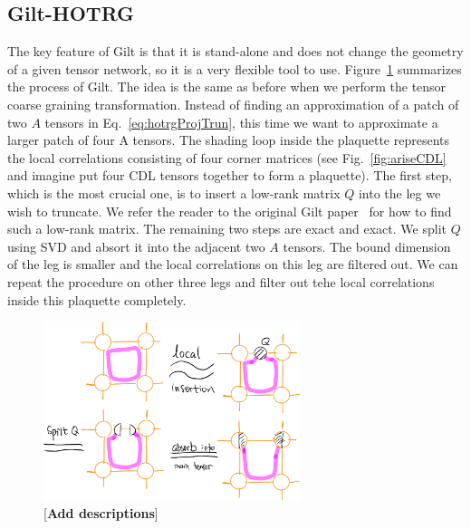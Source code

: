 \documentclass[aps,prb,reprint,superscriptaddress]{revtex4-2}
\begin{document}
\subsection{Gilt-HOTRG\label{gilt-hotrg}}
The key feature of Gilt is that it is stand-alone and does
not change the geometry of a given tensor network, so it is a very
flexible tool to use. Figure~\ref{fig:gilt} summarizes the process of
Gilt. The idea is the same as before when we perform the tensor coarse
graining transformation. Instead of finding an approximation of a patch
of two $A$ tensors in Eq.~\eqref{eq:hotrgProjTrun}, this time we want to
approximate a larger patch of four A tensors. The shading loop inside
the plaquette represents the local correlations consisting of four
corner matrices (see Fig.~\ref{fig:ariseCDL} and imagine put four CDL
tensors together to form a plaquette). The first step, which is the
most crucial one, is to insert a low-rank matrix $Q$ into the leg we
wish to truncate. We refer the reader to the original Gilt
paper~\cite{gilts} for how to find such a low-rank matrix. The remaining
two steps are exact and exact. We split $Q$ using SVD and absort it into
the adjacent two $A$ tensors. The bound dimension of the leg is smaller
and the local correlations on this leg are filtered out. We can repeat
the procedure on other three legs and filter out tehe local correlations
inside this plaquette completely.
%
\begin{figure}[h]
    \includegraphics[width=7.5cm]{./figs/gilt}
    \caption{\label{fig:gilt}[\textbf{Add descriptions}]}
\end{figure}
%
\end{document}

